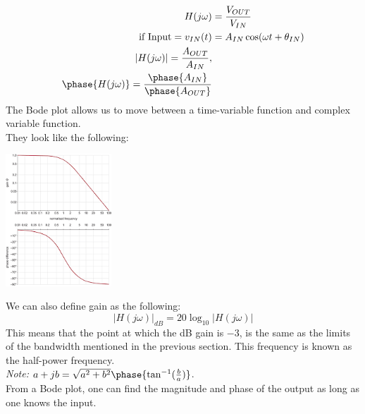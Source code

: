 \documentclass[nobib]{tufte-handout}
\begin{document}
\begin{align*}
    H(j\omega) &= \frac{V_{OUT}}{V_{IN}}\\
    \text{if Input}= v_{IN}(t) &= A_{IN}\cos(\omega t+\theta_{IN})\\
    |H(j\omega)| = \frac{A_{OUT}}{A_{IN}},\\
    \phase{H(j\omega)} = \frac{\phase{A_{IN}}}{\phase{A_{OUT}}}
\end{align*}
The Bode plot allows us to move between a time-variable function and complex variable function.\\
They look like the following:
\begin{center}
    \includegraphics[width = 150px]{images/bode_plot.png}
\end{center}
We can also define gain as the following:
\begin{equation*}
    |H(j\omega)|_{dB} = 20\log_{10}|H(j\omega)|
\end{equation*}
This means that the point at which the dB gain is $-3$, is the same as the limits of the bandwidth mentioned in the previous section. This frequency is known as the half-power frequency.\\
\textit{Note: $a+jb = \sqrt{a^2+b^2}\phase{\tan^{-1}(\frac{b}{a})}$}.\\
From a Bode plot, one can find the magnitude and phase of the output as long as one knows the input.\\
\end{document}
